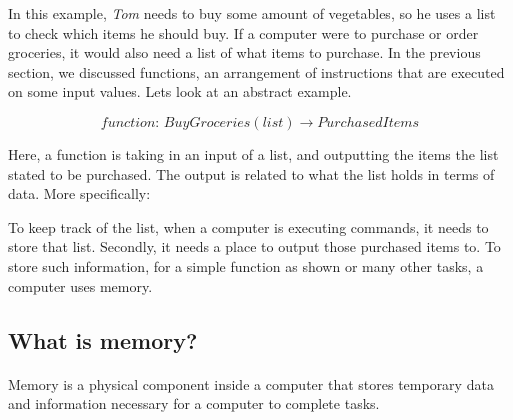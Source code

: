 In this example, \textit{Tom} needs to buy some amount of vegetables, so he uses a list to check which items he should buy. If a computer were to purchase or order groceries, it would also need a list of what items to purchase. In the previous section, we discussed functions, an arrangement of instructions that are executed on some input values. Lets look at an abstract example.

$$
function:\hspace{2pt} BuyGroceries(list) \rightarrow PurchasedItems
$$

Here, a function is taking in an input of a list, and outputting the items the list stated to be purchased. The output is related to what the list holds in terms of data. More specifically:

\begin{center}
\end{center}

To keep track of the list, when a computer is executing commands, it needs to store that list. Secondly, it needs a place to output those purchased items to. To store such information, for a simple function as shown or many other tasks, a computer uses memory.

\subsection{What is memory?}

\paragraph{   } Memory is a physical component inside a computer that stores temporary data and information necessary for a computer to complete tasks.